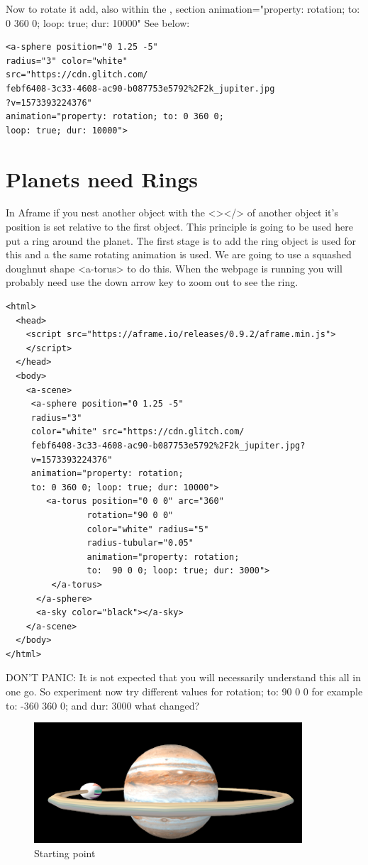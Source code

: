 Now to rotate it  add, also within the , section animation="property: rotation; to: 0 360 0; loop: true; dur: 10000" See below:

\begin{lstlisting}
<a-sphere position="0 1.25 -5" 
radius="3" color="white" 
src="https://cdn.glitch.com/
febf6408-3c33-4608-ac90-b087753e5792%2F2k_jupiter.jpg
?v=1573393224376"
animation="property: rotation; to: 0 360 0; 
loop: true; dur: 10000">
\end{lstlisting}

\section{Planets need Rings}
In Aframe if you nest another object with the <></> of another object it's position is set relative to the first object. This principle is going to be used here put a ring around the planet. The first stage is to add the ring object is used for this and a the same rotating animation is used. We are going to use a squashed doughnut shape <a-torus> to do this. When the webpage is running you will probably need use the down arrow key to zoom out to see the ring.

\begin{lstlisting}
<html>
  <head>
    <script src="https://aframe.io/releases/0.9.2/aframe.min.js">
    </script>
  </head>
  <body>
    <a-scene>
     <a-sphere position="0 1.25 -5" 
     radius="3" 
     color="white" src="https://cdn.glitch.com/
     febf6408-3c33-4608-ac90-b087753e5792%2F2k_jupiter.jpg?
     v=1573393224376"
     animation="property: rotation; 
     to: 0 360 0; loop: true; dur: 10000">
        <a-torus position="0 0 0" arc="360"
                rotation="90 0 0"
                color="white" radius="5"
                radius-tubular="0.05"
                animation="property: rotation; 
                to:  90 0 0; loop: true; dur: 3000">
         </a-torus>
      </a-sphere>   
      <a-sky color="black"></a-sky>
    </a-scene>
  </body>
</html>
\end{lstlisting}

DON'T PANIC: It is not expected that you will necessarily understand this all in one go. So experiment now try different values for rotation; to:  90 0 0  for example to:  -360 360 0; and dur: 3000 what changed? 

\begin{figure}
    \centering
    \includegraphics[width=10cm]{chapters/chapter2/figures/Picture1.png}
    \caption{Starting point}
    \label{fig:Picture1}
\end{figure}


